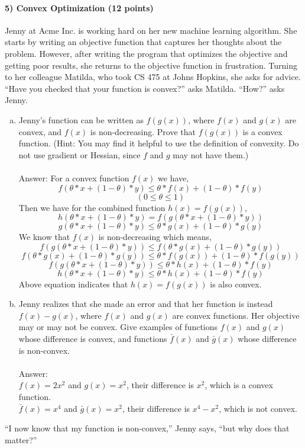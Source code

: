 \documentclass[11pt]{article}
\begin{document}
\paragraph{5) Convex Optimization (12 points)}
Jenny at Acme Inc. is working hard on her new machine learning algorithm. She starts by writing an objective function
that captures her thoughts about the problem. However, after writing the program that optimizes the objective
and getting poor results, she returns to the objective function in frustration. Turning to her colleague Matilda,
who took CS 475 at Johns Hopkins, she asks for advice. ``Have you checked that your function is convex?'' asks Matilda.
``How?'' asks Jenny.
\begin{enumerate}[(a)]
\item Jenny's function can be written as $f(g(x))$, where $f(x)$ and $g(x)$ are convex, and $f(x)$ is non-decreasing. Prove that $f(g(x))$ is a convex function. (Hint: You may find it helpful to use the definition of convexity. Do not use gradient or Hessian, since $f$ and $g$ may not have them.)\\\\
Answer:
For a convex function $f(x)$ we have,
$$f(\theta*x+(1-\theta)*y) \leq \theta*f(x)+(1-\theta)*f(y)$$
$$(0\leq\theta\leq1)$$
Then we have for the combined function $h(x)=f(g(x))$,
$$h(\theta*x+(1-\theta)*y) = f(g(\theta*x+(1-\theta)*y))$$
$$g(\theta*x+(1-\theta)*y) \leq \theta*g(x)+(1-\theta)*g(y)$$
We know that $f(x)$ is non-decreasing which means,
$$f(g(\theta*x+(1-\theta)*y)) \leq f(\theta*g(x)+(1-\theta)*g(y))$$
$$f(\theta*g(x)+(1-\theta)*g(y)) \leq \theta*f(g(x))+(1-\theta)*f(g(y))$$
$$f(g(\theta*x+(1-\theta)*y)) \leq \theta*h(x)+(1-\theta)*f(y)$$
$$h(\theta*x+(1-\theta)*y) \leq \theta*h(x)+(1-\theta)*f(y)$$
Above equation indicates that $h(x)=f(g(x))$ is also convex.
\item Jenny realizes that she made an error and that her function is instead
$f(x)-g(x)$, where $f(x)$ and $g(x)$ are convex functions. Her objective may or may not be convex. Give examples of functions $f(x)$ and $g(x)$ whose difference is convex, and functions $\bar{f}(x)$ and $\bar{g}(x)$ whose difference is non-convex.\\\\
Answer: \\
$f(x) = 2x^2$ and $g(x) = x^2$, their difference is $x^2$, which is a convex function.\\
$\bar{f}(x)=x^4$ and $\bar{g}(x)=x^2$, their difference is $x^4 - x^2$, which is not convex.\\

\end{enumerate}
``I now know that my function is non-convex,'' Jenny says, ``but why does that matter?''
\end{document}

